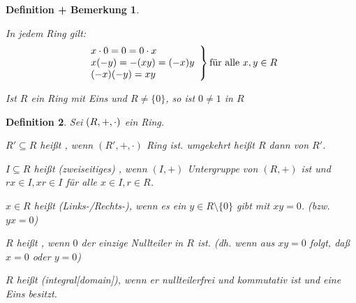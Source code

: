 \documentclass[a4paper,10pt,german]{scrbook}
\theoremstyle{saetze}
\theoremstyle{definitionen}
\newtheorem{Def}{Definition}[section]
\newtheorem{DefBem}[Def]{Definition + Bemerkung}
\begin{document}
\begin{DefBem}
\begin{enum}
\item In jedem Ring gilt:
\[\left. \begin{array}{l}
x\cdot 0 = 0 = 0\cdot x \\
x(-y) = - (xy) = (-x)y \\
(-x)(-y) = xy \end{array} \right\} \mbox{für alle } x,y \in R\]

\item Ist $R$ ein Ring mit Eins und $R \neq \{0\}$, so ist $0 \neq
1$ in $R$ 
\end{enum}
\end{DefBem}

\begin{Def}
Sei $(R,+,\cdot)$ ein Ring.
\begin{enum}
\item $R' \subseteq R$ heißt , wenn $(R',+,\cdot)$ Ring
ist. umgekehrt heißt $R$ dann  von $R'$.
\item $I \subseteq R$ heißt (zweiseitiges) , wenn $(I,+)$
Untergruppe von $(R,+)$ ist und $rx \in I, xr \in I$ für alle $x \in
I, r \in R$.
\item $x\in R$ heißt (Links-/Rechts-), wenn es ein
$y \in R \setminus \{0\}$ gibt mit $xy = 0$. (bzw. $yx = 0$)
\item $R$ heißt , wenn $0$ der einzige
Nullteiler in $R$ ist. (dh. wenn aus $xy = 0$ folgt, daß $x=0$ oder
$y=0$)
\item $R$ heißt  (integral[domain]), wenn er
nullteilerfrei und kommutativ ist und eine Eins besitzt.
\end{enum}
\end{Def}
\end{document}
